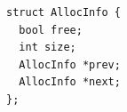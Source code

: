 \documentclass[tikz]{standalone}
\begin{document}
\begin{lrbox}{\allocInfoDecl}
\begin{lstlisting}
struct AllocInfo {
  bool free;
  int size;
  AllocInfo *prev;
  AllocInfo *next;
};
\end{lstlisting}
\end{lrbox}


\end{document}
